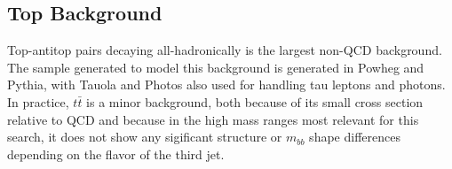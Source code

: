 

























\subsection{Top Background}
Top-antitop pairs decaying all-hadronically is the largest non-QCD background.  The sample generated
to model this background is generated in Powheg and Pythia, with Tauola and Photos also used for
handling tau leptons and photons.  In practice, $t\bar{t}$ is a minor background, both because
of its small cross section relative to QCD and because in the high mass ranges most relevant for
this search, it does not show any sigificant structure or $m_{bb}$ shape differences depending
on the flavor of the third jet.


